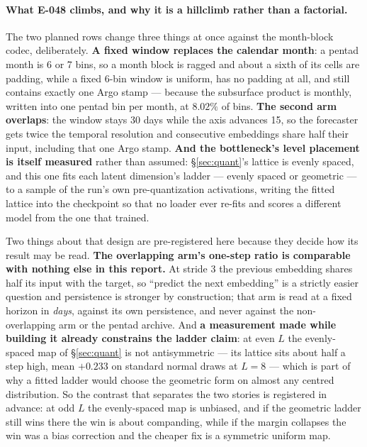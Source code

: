 \documentclass[10pt]{article}
\begin{document}
\paragraph{What E-048 climbs, and why it is a hillclimb rather than a
factorial.} The two planned rows change three things at once against the
month-block codec, deliberately. \textbf{A fixed window replaces the calendar
month}: a pentad month is 6 or 7 bins, so a month block is ragged and about a
sixth of its cells are padding, while a fixed 6-bin window is uniform, has no
padding at all, and still contains exactly one Argo stamp --- because the
subsurface product is monthly, written into one pentad bin per month, at
$8.02\%$ of bins. \textbf{The second arm overlaps}: the window stays 30 days
while the axis advances 15, so the forecaster gets twice the temporal
resolution and consecutive embeddings share half their input, including that
one Argo stamp. \textbf{And the bottleneck's level placement is itself
measured} rather than assumed: \S\ref{sec:quant}'s lattice is evenly spaced,
and this one fits each latent dimension's ladder --- evenly spaced or
geometric --- to a sample of the run's own pre-quantization activations,
writing the fitted lattice into the checkpoint so that no loader ever re-fits
and scores a different model from the one that trained.

Two things about that design are pre-registered here because they decide how
its result may be read. \textbf{The overlapping arm's one-step ratio is
comparable with nothing else in this report.} At stride 3 the previous
embedding shares half its input with the target, so ``predict the next
embedding'' is a strictly easier question and persistence is stronger by
construction; that arm is read at a fixed horizon in \emph{days}, against its
own persistence, and never against the non-overlapping arm or the pentad
archive. And \textbf{a measurement made while building it already constrains
the ladder claim}: at even $L$ the evenly-spaced map of \S\ref{sec:quant} is
not antisymmetric --- its lattice sits about half a step high, mean $+0.233$
on standard normal draws at $L{=}8$ --- which is part of why a fitted ladder
would choose the geometric form on almost any centred distribution. So the
contrast that separates the two stories is registered in advance: at odd $L$
the evenly-spaced map is unbiased, and if the geometric ladder still wins
there the win is about companding, while if the margin collapses the win was
a bias correction and the cheaper fix is a symmetric uniform map.
\end{document}
